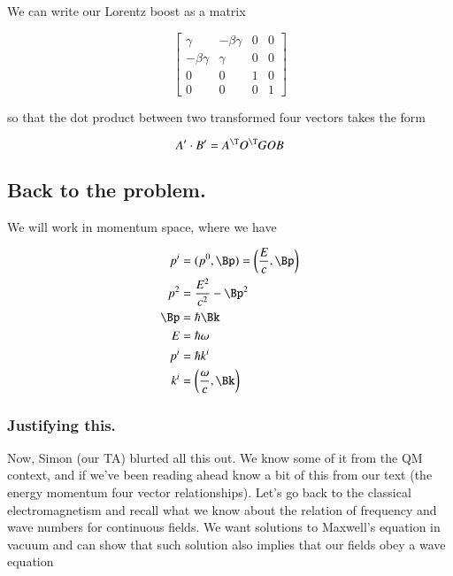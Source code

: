 We can write our Lorentz boost as a matrix

\begin{equation}\label{eqn:relativisticElectrodynamicsT1:110}
\begin{bmatrix}
\gamma & -\beta \gamma & 0 & 0 \\
-\beta \gamma & \gamma & 0 & 0 \\
0 & 0 & 1 & 0 \\
0 & 0 & 0 & 1 
\end{bmatrix}
\end{equation}

so that the dot product between two transformed four vectors takes the form

\begin{equation}\label{eqn:relativisticElectrodynamicsT1:120}
A' \cdot B' = A^\T O^\T G O B
\end{equation}

\subsection{Back to the problem.}

We will work in momentum space, where we have

\begin{align}\label{eqn:relativisticElectrodynamicsT1:130}
p^i &= (p^0, \Bp) = \left( \frac{E}{c}, \Bp\right) \\
p^2 &= \frac{E^2}{c^2} -\Bp^2 \\
\Bp &= \hbar \Bk \\
E &= \hbar \omega \\
p^i &= \hbar k^i \\
k^i &= \left(\frac{\omega}{c}, \Bk\right)
\end{align}

\subsubsection{Justifying this.}

Now, Simon (our TA) blurted all this out.  We know some of it from the QM context, and if we've been reading ahead know a bit of this from our text \citep{landau1980classical} (the energy momentum four vector relationships).  Let's go back to the classical electromagnetism and recall what we know about the relation of frequency and wave numbers for continuous fields.  We want solutions to Maxwell's equation in vacuum and can show that such solution also implies that our fields obey a wave equation

